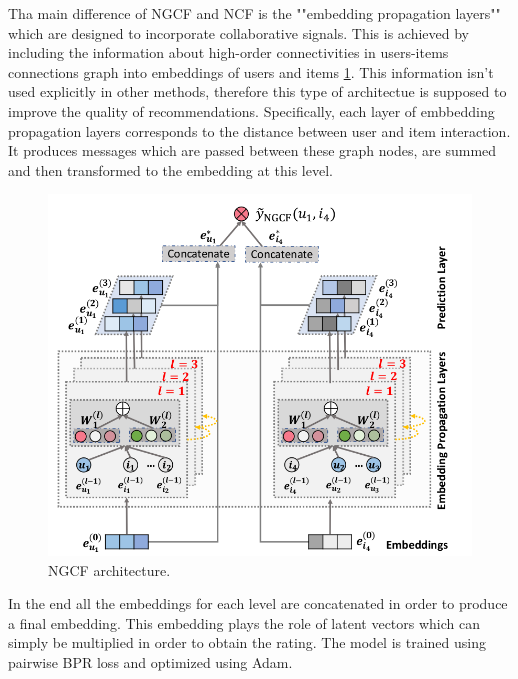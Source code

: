 
Tha main difference of NGCF \cite{wang2019neural} and NCF is the ""embedding propagation layers"" which are 
designed to incorporate collaborative signals.
This is achieved by including the information about high-order connectivities 
in users-items connections graph into embeddings of users and items \ref{fig:ngcf}.
This information isn't used explicitly in other methods, therefore this type 
of architectue is supposed to improve the quality of recommendations.
Specifically, each layer of embbedding propagation layers corresponds 
to the distance between user and item interaction. It produces messages which 
are passed between these graph nodes, are summed and then transformed to the 
embedding at this level.
\begin{figure}[h]
    \centering
    \includegraphics[width=0.8\linewidth]{images/ngcf.png}
    \caption{NGCF architecture.}
    \label{fig:ngcf}
\end{figure}
In the end all the embeddings for each level are concatenated in order to produce a final embedding.
This embedding plays the role of latent vectors which can simply be multiplied in order to obtain the rating.
The model is trained using pairwise BPR loss and optimized using Adam.